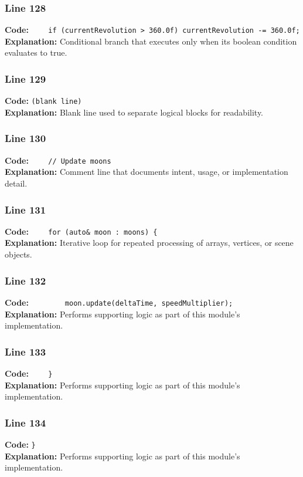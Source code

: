 \documentclass[11pt,a4paper]{article}
\begin{document}
\subsubsection*{Line 128}
\textbf{Code:} \verb|    if (currentRevolution > 360.0f) currentRevolution -= 360.0f;|\\
\textbf{Explanation:} Conditional branch that executes only when its boolean condition evaluates to true.

\subsubsection*{Line 129}
\textbf{Code:} \texttt{(blank line)}\\
\textbf{Explanation:} Blank line used to separate logical blocks for readability.

\subsubsection*{Line 130}
\textbf{Code:} \verb|    // Update moons|\\
\textbf{Explanation:} Comment line that documents intent, usage, or implementation detail.

\subsubsection*{Line 131}
\textbf{Code:} \verb|    for (auto& moon : moons) {|\\
\textbf{Explanation:} Iterative loop for repeated processing of arrays, vertices, or scene objects.

\subsubsection*{Line 132}
\textbf{Code:} \verb|        moon.update(deltaTime, speedMultiplier);|\\
\textbf{Explanation:} Performs supporting logic as part of this module's implementation.

\subsubsection*{Line 133}
\textbf{Code:} \verb|    }|\\
\textbf{Explanation:} Performs supporting logic as part of this module's implementation.

\subsubsection*{Line 134}
\textbf{Code:} \verb|}|\\
\textbf{Explanation:} Performs supporting logic as part of this module's implementation.
\end{document}
